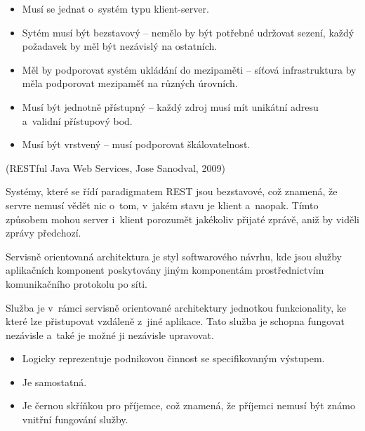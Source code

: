 \documentclass[12pt]{article}
\begin{document}
{
\begin{itemize}
\item Musí se jednat o~systém typu klient-server.
\item Sytém musí být bezstavový -- nemělo by být potřebné udržovat sezení, každý požadavek by měl být nezávislý na ostatních.
\item Měl by podporovat systém ukládání do mezipaměti -- síťová infrastruktura by měla podporovat mezipaměť na různých úrovních.
\item Musí být jednotně přístupný -- každý zdroj musí mít unikátní adresu a~validní přístupový bod.
\item Musí být vrstvený -- musí podporovat škálovatelnost.
\end{itemize}

(RESTful Java Web Services, Jose Sanodval, 2009)


Systémy, které se řídí paradigmatem REST jsou bezstavové, což znamená,
že servre nemusí vědět nic o~tom, v~jakém stavu je klient a~naopak.
Tímto způsobem mohou server i~klient porozumět  jakékoliv přijaté zprávě,
aniž by viděli zprávy předchozí.


Servisně orientovaná architektura je styl softwarového návrhu, 
kde jsou služby aplikačních komponent poskytovány jiným komponentám
prostřednictvím komunikačního protokolu po síti.

Služba je v~rámci servisně orientované architektury jednotkou funkcionality, 
ke které lze přistupovat vzdáleně z~jiné aplikace.
Tato služba je schopna fungovat nezávisle a~také je možné ji nezávisle upravovat.

\bigskip


\begin{itemize}

\item Logicky reprezentuje podnikovou činnost se specifikovaným výstupem.

\item Je samostatná.

\item Je černou skříňkou pro příjemce, což znamená,
      že příjemci nemusí být známo vnitřní fungování služby.
      

\end{itemize}}
\end{document}
